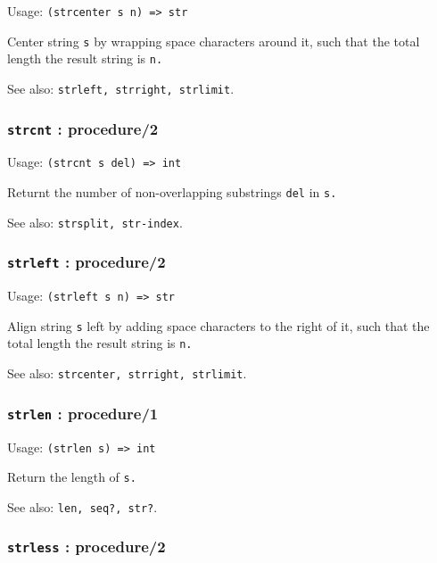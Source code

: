 \documentclass[
]{article}
\newcommand{\passthrough}[1]{#1}
\begin{document}
Usage: \passthrough{\lstinline!(strcenter s n) => str!}

Center string \passthrough{\lstinline!s!} by wrapping space characters
around it, such that the total length the result string is
\passthrough{\lstinline!n.!}

See also: \passthrough{\lstinline!strleft, strright, strlimit!}.

\hypertarget{strcnt-procedure2}{%
\subsubsection{\texorpdfstring{\texttt{strcnt} :
procedure/2}{strcnt : procedure/2}}\label{strcnt-procedure2}}

Usage: \passthrough{\lstinline!(strcnt s del) => int!}

Returnt the number of non-overlapping substrings
\passthrough{\lstinline!del!} in \passthrough{\lstinline!s.!}

See also: \passthrough{\lstinline!strsplit, str-index!}.

\hypertarget{strleft-procedure2}{%
\subsubsection{\texorpdfstring{\texttt{strleft} :
procedure/2}{strleft : procedure/2}}\label{strleft-procedure2}}

Usage: \passthrough{\lstinline!(strleft s n) => str!}

Align string \passthrough{\lstinline!s!} left by adding space characters
to the right of it, such that the total length the result string is
\passthrough{\lstinline!n.!}

See also: \passthrough{\lstinline!strcenter, strright, strlimit!}.

\hypertarget{strlen-procedure1}{%
\subsubsection{\texorpdfstring{\texttt{strlen} :
procedure/1}{strlen : procedure/1}}\label{strlen-procedure1}}

Usage: \passthrough{\lstinline!(strlen s) => int!}

Return the length of \passthrough{\lstinline!s.!}

See also: \passthrough{\lstinline!len, seq?, str?!}.

\hypertarget{strless-procedure2}{%
\subsubsection{\texorpdfstring{\texttt{strless} :
procedure/2}{strless : procedure/2}}\label{strless-procedure2}}
\end{document}
